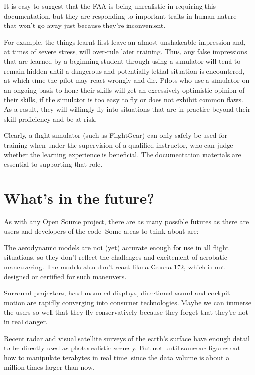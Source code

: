 \documentclass[a4paper,10pt]{article}
\begin{document}
It is easy to suggest that the FAA is being unrealistic in requiring
this documentation, but they are responding to important traits
in human nature that won't go away just because they're inconvenient.

For example, the things learnt first leave an almost unshakeable
impression and, at times of severe stress, will over-rule later
training.  Thus, any false impressions that are learned by a
beginning student through using a simulator will tend to remain
hidden until a dangerous and potentially lethal situation is
encountered, at which time the pilot may react wrongly and die.
Pilots who use a simulator on an ongoing basis to hone their skills
will get an excessively optimistic opinion of their skills, if the
simulator is too easy to fly or does not exhibit common flaws.
As a result, they will willingly fly into situations that are
in practice beyond their skill proficiency and be at risk.

Clearly, a flight simulator (such as FlightGear) can only safely
be used for training when under the supervision of a qualified
instructor, who can judge whether the learning experience is beneficial.
The documentation materials are essential to supporting that role.
%
%
\section*{What's in the future?}
%
As with any Open Source project, there are as many possible futures as there
are users and developers of the code.  Some areas to think about are:

The aerodynamic models are not (yet) accurate enough for use in all
flight situations, so they don't reflect the challenges
and excitement of acrobatic maneuvering.  The models also don't react like
a Cessna 172, which is not designed or certified for such maneuvers.

Surround projectors, head mounted displays, directional sound
and cockpit motion are rapidly converging into consumer technologies.
Maybe we can immerse the users so well that they fly conservatively
because they forget that they're not in real danger.

Recent radar and visual satellite surveys of the earth's surface
have enough detail to be directly used as photorealistic scenery.
But not until someone figures out how to manipulate terabytes in real time,
since the data volume is about a million times larger than now.
\end{document}
